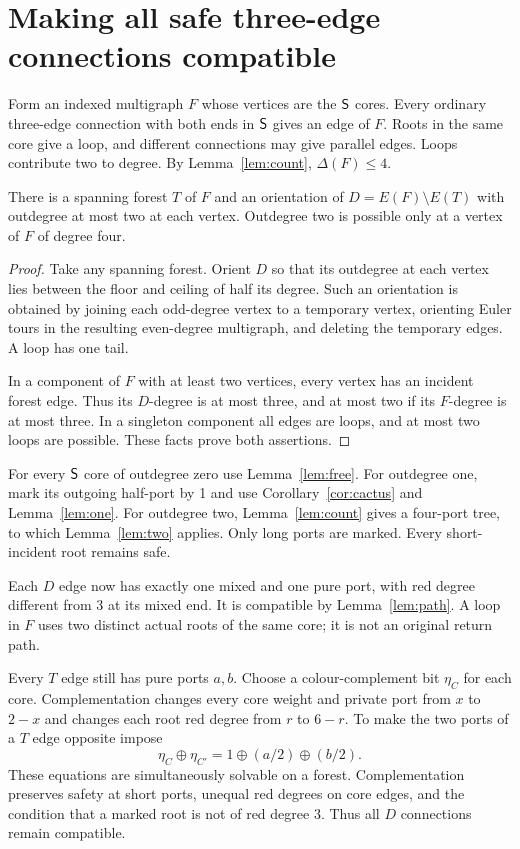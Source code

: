 \section{Making all safe three-edge connections compatible}\label{sec:glue}

Form an indexed multigraph $F$ whose vertices are the $\mathsf S$ cores.
Every ordinary three-edge connection with both ends in $\mathsf S$ gives an
edge of $F$.  Roots in the same core give a loop, and different
connections may give parallel edges.  Loops contribute two to degree.
By Lemma~\ref{lem:count}, $\Delta(F)\le4$.

\begin{lemma}\label{lem:orient}
There is a spanning forest $T$ of $F$ and an orientation of
$D=E(F)\setminus E(T)$ with outdegree at most two at each vertex.
Outdegree two is possible only at a vertex of $F$ of degree four.
\end{lemma}
\begin{proof}
Take any spanning forest.  Orient $D$ so that its outdegree at each
vertex lies between the floor and ceiling of half its degree.  Such
an orientation is obtained by joining each odd-degree vertex to a
temporary vertex, orienting Euler tours in the resulting even-degree
multigraph, and deleting the temporary edges.  A loop has one tail.

In a component of $F$ with at least two vertices, every vertex has an
incident forest edge.  Thus its $D$-degree is at most three, and at
most two if its $F$-degree is at most three.  In a singleton component
all edges are loops, and at most two loops are possible.  These facts
prove both assertions.
\end{proof}

For every $\mathsf S$ core of outdegree zero use Lemma~\ref{lem:free}.
For outdegree one, mark its outgoing half-port by 1 and use
Corollary~\ref{cor:cactus} and Lemma~\ref{lem:one}.
For outdegree two, Lemma~\ref{lem:count} gives a four-port tree, to
which Lemma~\ref{lem:two} applies.  Only long ports are marked.
Every short-incident root remains safe.

Each $D$ edge now has exactly one mixed and one pure port, with red
degree different from 3 at its mixed end.  It is compatible by
Lemma~\ref{lem:path}.  A loop in $F$ uses two distinct actual roots of
the same core; it is not an original return path.

Every $T$ edge still has pure ports $a,b$.  Choose a colour-complement
bit $\eta_C$ for each core.  Complementation changes every core weight
and private port from $x$ to $2-x$ and changes each root red degree
from $r$ to $6-r$.  To make the two ports of a $T$ edge opposite impose
\begin{equation}\label{eq:xor}
 \eta_C\oplus\eta_{C'}=1\oplus(a/2)\oplus(b/2).
\end{equation}
These equations are simultaneously solvable on a forest.
Complementation preserves safety at short ports, unequal red degrees
on core edges, and the condition that a marked root is not of red
degree 3.  Thus all $D$ connections remain compatible.

